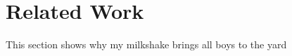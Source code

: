 \section{Related Work}
\label{sec:related}
This section shows why my milkshake brings all boys to the yard
